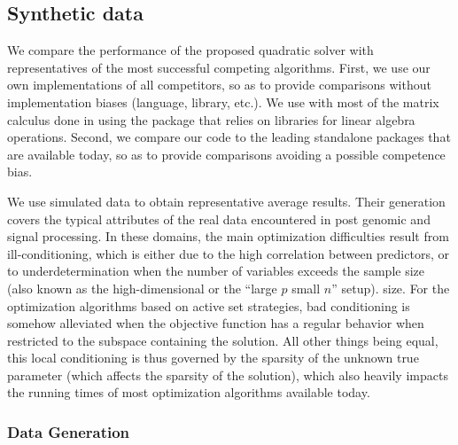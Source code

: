 \subsection{Synthetic data}

We compare the performance of the proposed quadratic solver with
representatives of the most successful competing algorithms.
First, we use our own implementations of all competitors, so as to provide
comparisons without implementation biases (language, library, etc.).
We use  with most of the matrix calculus done in  using
the  package \citep{2011_JSS_rcpp,armadillo} that relies
on  libraries for linear algebra operations.
Second, we compare our code to the leading standalone packages that are
available today, so as to provide comparisons avoiding a possible competence
bias.

We use simulated data to obtain representative average results. 
Their generation covers the typical attributes of the real data encountered in
post genomic and signal processing.
In these domains, the main optimization difficulties result from
ill-conditioning, which is either due to the high correlation between
predictors, or to underdetermination when the number of variables
exceeds the sample 
\iflong 
  size (also known as the high-dimensional or the ``large $p$ small $n$'' 
  setup).
\else
  size.
\fi
For the optimization algorithms based on active set strategies, bad
conditioning is somehow alleviated when the objective function has a regular
behavior when restricted to the subspace containing the solution.  All other
things being equal, this local conditioning is thus governed by the
sparsity of the unknown true parameter (which affects the sparsity of
the solution), which also heavily impacts the running times of most
optimization algorithms available today.

\subsubsection{Data Generation}

